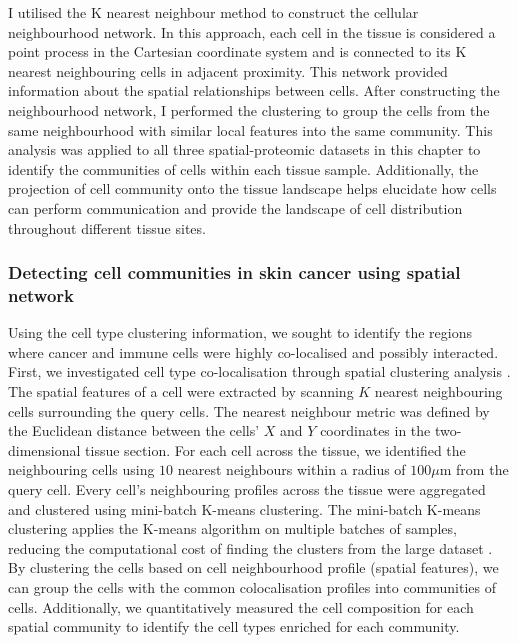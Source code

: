 I utilised the K nearest neighbour method to construct the cellular neighbourhood network. In this approach, each cell in the tissue is considered a point process in the Cartesian coordinate system and is connected to its K nearest neighbouring cells in adjacent proximity. This network provided information about the spatial relationships between cells. After constructing the neighbourhood network, I performed the clustering to group the cells from the same neighbourhood with similar local features into the same community. This analysis was applied to all three spatial-proteomic datasets in this chapter to identify the communities of cells within each tissue sample. Additionally, the projection of cell community onto the tissue landscape helps elucidate how cells can perform communication and provide the landscape of cell distribution throughout different tissue sites. 

\subsubsection{Detecting cell communities in skin cancer using spatial network}
\label{Sec:3_cell_communities_and_coocurrence}	%
Using the cell type clustering information, we sought to identify the regions where cancer and immune cells were highly co-localised and possibly interacted. First, we investigated cell type co-localisation through spatial clustering analysis \cite{schurch2020coordinated}. The spatial features of a cell were extracted by scanning $K$ nearest neighbouring cells surrounding the query cells. The nearest neighbour metric was defined by the Euclidean distance between the cells' $X$ and $Y$ coordinates in the two-dimensional tissue section. For each cell across the tissue, we identified the neighbouring cells using $10$ nearest neighbours within a radius of $100\mu$m from the query cell. Every cell's neighbouring profiles across the tissue were aggregated and clustered using mini-batch K-means clustering. The mini-batch K-means clustering applies the  K-means algorithm on multiple batches of samples, reducing the computational cost of finding the clusters from the large dataset \cite{sculley2010web}. By clustering the cells based on cell neighbourhood profile (\ie spatial features), we can group the cells with the common colocalisation profiles into communities of cells. Additionally, we quantitatively measured the cell composition for each spatial community to identify the cell types enriched for each community. 


